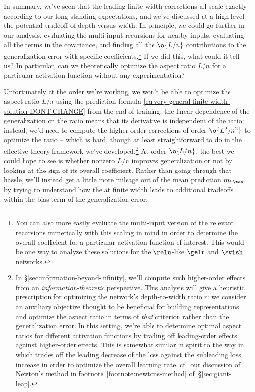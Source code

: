 In summary, we've seen that the leading finite-width corrections all scale
 exactly according to our long-standing expectations, and we've discussed at a high level the potential tradeoff of depth versus width. In principle, we could go further in our analysis, evaluating the multi-input recursions for nearby inputs, evaluating all the terms in the covariance, and finding all the $\o{L/n}$ contributions to the generalization error with specific coefficients.\footnote{You can also more easily evaluate the multi-input version of the relevant recursions numerically with this scaling in mind in order to determine the overall coefficient for a particular activation function of interest. This would be one way to analyze these solutions for the $\relu$-like $\gelu$ and $\swish$ networks.} If we did this, what could it tell us? In particular, can we theoretically optimize the aspect ratio $L/n$ for a particular activation function without any experimentation?



Unfortunately at the order we're working, we won't be able to optimize the aspect ratio $L/n$ using the prediction formula \eqref{eq:very-general-finite-width-solution-DONT-CHANGE} from the end of training: the linear dependence of the generalization on the ratio means that its derivative is independent of the ratio; instead, we'd need to compute the higher-order corrections of order $\o{L^2/n^2}$ to optimize the ratio -- which is hard, though at least straightforward to do in the effective theory framework we've developed.\footnote{
    In \S\ref{sec:information-beyond-infinity}, we'll compute such higher-order effects  from an \emph{information-theoretic} perspective. This analysis will give a heuristic prescription for optimizing the network's depth-to-width ratio $r$: we consider an auxiliary  objective thought to be beneficial for building representations and optimize the aspect ratio in terms of \emph{that} criterion rather than the generalization error. In this setting, we're able to determine optimal aspect ratios for different activation functions by trading off leading-order effects against higher-order effects. This is somewhat similar in spirit to the way in which  trades off the leading decrease of the loss against the subleading loss increase in order to optimize the overall learning rate, cf.~our discussion of Newton's method in footnote~\ref{footnote:newtons-method} of~\S\ref{sec:giant-leap}.
}
At order $\o{L/n}$, the best we could hope to see is whether nonzero $L/n$ improves generalization or not by looking at the sign of its overall coefficient.
Rather than going through that hassle, we'll instead get a little more mileage out of the mean prediction $m_{i;\tea}$ by trying to understand how the  at finite width leads to additional tradeoffs within the bias term of the generalization error.











